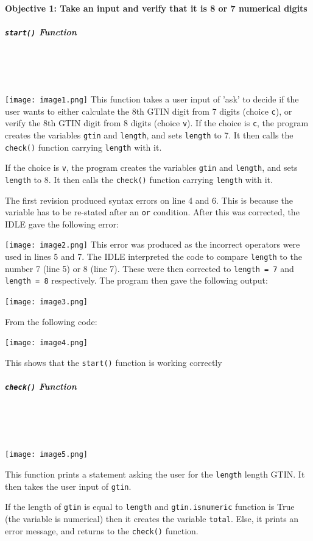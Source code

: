 \documentclass[a4paper]{article}
\begin{document}
\paragraph{Objective 1: Take an input and verify that it is 8 or 7 numerical digits}
\subparagraph{\texttt{start()} Function} ~ \par ~ \par
\noindent\texttt{[image: image1.png]}
This function takes a user input of 'ask' to decide if the user wants to either calculate the 8th GTIN digit from 7 digits (choice \verb|c|), or verify the 8th GTIN digit from 8 digits (choice \verb|v|). 
If the choice is \verb|c|, the program creates the variables \verb|gtin| and \verb|length|, and sets \verb|length| to 7. It then calls the \verb|check()| function carrying \verb|length| with it. \par
If the choice is \verb|v|, the program creates the variables \verb|gtin| and \verb|length|, and sets \verb|length| to 8. It then calls the \verb|check()| function carrying \verb|length| with it. \par
The first revision produced syntax errors on line 4 and 6. This is because the variable has to be re-stated after an \verb|or| condition. After this was corrected, the IDLE gave the following error: \par
\noindent\texttt{[image: image2.png]}
This error was produced as the incorrect operators were used in lines 5 and 7. The IDLE interpreted the code to compare \verb|length| to the number 7 (line 5) or 8 (line 7). These were then corrected to \verb|length = 7| and \verb|length = 8| respectively. The program then gave the following output: \par
\noindent\texttt{[image: image3.png]} \par
From the following code: \par
\noindent\texttt{[image: image4.png]} \par 
This shows that the \verb|start()| function is working correctly
\newpage
\subparagraph{\texttt{check()} Function} ~ \par ~ \par
\noindent\texttt{[image: image5.png]} \par
This function prints a statement asking the user for the \verb|length| length GTIN. It then takes the user input of \verb|gtin|. \par
If the length of \verb|gtin| is equal to \verb|length| and \verb|gtin.isnumeric| function is True (the variable is numerical) then it creates the variable \verb|total|. Else, it prints an error message, and returns to the \verb|check()| function. \par
\end{document}

